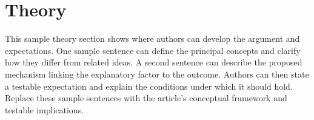 \section{Theory} 
\label{sec:theory}

This sample theory section shows where authors can develop the argument and expectations. One sample sentence can define the principal concepts and clarify how they differ from related ideas. A second sentence can describe the proposed mechanism linking the explanatory factor to the outcome. Authors can then state a testable expectation and explain the conditions under which it should hold. Replace these sample sentences with the article's conceptual framework and testable implications.
